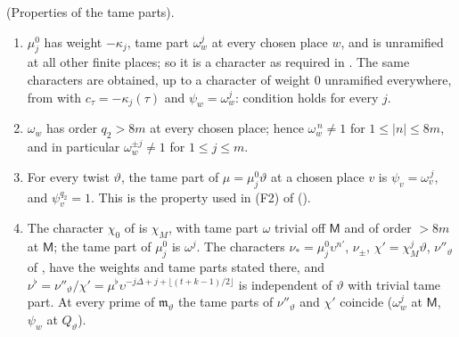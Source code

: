 \documentclass[10pt]{amsart}
\theoremstyle{definition}
\theoremstyle{remark}
\providecommand{\pfqm}{\mathfrak m_\vartheta}
\newenvironment{quotedthm}[2]{\par\medskip\noindent\begingroup
  \textbf{#1}#2.\ \itshape\ignorespaces}{\endgroup\par\medskip}
\begin{document}
\begin{quotedthm}{\cite[Proposition~6.15]{P54}}{ (Properties of the tame parts)}
\begin{enumerate}
\item[(T1)] $\mu^0_j$ has weight $-\kappa_j$, tame part $\omega_w^j$ at every chosen place $w$, and is unramified at all other finite
places; so it is a character as required in {\cite[\S14.3]{P46}}. The same characters are obtained, up to a character of weight $0$
unramified everywhere, from {\cite[Lemma~6.13]{P54}} with $c_\tau=-\kappa_j(\tau)$ and $\psi_w=\omega_w^j$: condition {\cite[(39)]{P54}}
holds for every $j$.
\item[(T2)] $\omega_w$ has order $q_2>8m$ at every chosen place; hence $\omega_w^{\,n}\ne1$ for $1\le|n|\le8m$, and in particular
$\omega_w^{\pm j}\ne1$ for $1\le j\le m$.
\item[(T3)] For every twist $\vartheta$, the tame part of $\mu=\mu^0_j\vartheta$ at a chosen place $v$ is $\psi_v=\omega_v^{\,j}$, and
$\psi_v^{q_2}=1$. This is the property used in (F2) of {\cite[Lemma~4.15]{P54}} ({\cite[Remark~4.16]{P54}}).
\item[(T4)] The character $\chi_0$ of {\cite[\S2.7]{P54}} is $\chi_M$, with tame part $\omega$ trivial off $\mathsf M$ and of order
$>8m$ at $\mathsf M$; the tame part of $\mu^0_j$ is $\omega^j$. The characters $\nu_\ast=\mu^0_j\upsilon^{n'}$, $\nu_\pm$,
$\chi'=\chi_M^j\vartheta$, $\nu''_\vartheta$ of {\cite[\S2.7]{P54}}, {\cite[\S3.2.6]{P54}} have the weights and tame parts stated there,
and $\nu^\flat=\nu''_\vartheta/\chi'=\mu^\flat\upsilon^{-j\Delta+j+\lfloor(t+k-1)/2\rfloor}$ is independent of $\vartheta$ with trivial tame part. At every
prime of $\pfqm$ the tame parts of $\nu''_\vartheta$ and $\chi'$ coincide ($\omega^j_w$ at $\mathsf M$, $\psi_w$ at $Q_\vartheta$).
\end{enumerate}
\end{quotedthm}
\end{document}
